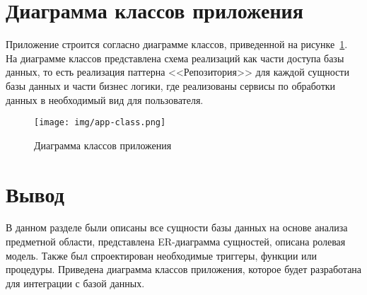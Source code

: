 \section{Диаграмма классов приложения}

Приложение строится согласно диаграмме классов, приведенной на рисунке~\ref{fig:appclass}.
На диаграмме классов представлена схема реализаций как части доступа базы данных, то есть реализация паттерна <<Репозитория>> для каждой сущности базы данных и части бизнес логики, где реализованы сервисы по обработки данных в необходимый вид для пользователя.

\clearpage

\begin{figure}[h]
	\centering
	\texttt{[image: img/app-class.png]}
	\caption{Диаграмма классов приложения}
	\label{fig:appclass}
\end{figure}

\section*{Вывод}

В данном разделе были описаны все сущности базы данных на основе анализа предметной области, представлена ER-диаграмма сущностей, описана ролевая модель.
Также был спроектирован необходимые триггеры, функции или процедуры. 
Приведена диаграмма классов приложения, которое будет разработана для интеграции с базой данных.